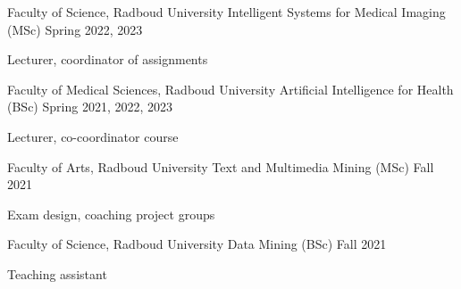 

\begin{cventries}


  \cventry
    {Faculty of Science, Radboud University} %
    {Intelligent Systems for Medical Imaging (MSc)} %
    {}
    {Spring 2022, 2023} %
    {
      \begin{cvitems} %
        \item {Lecturer, coordinator of assignments}
      \end{cvitems}
    }

  \cventry
    {Faculty of Medical Sciences, Radboud University} %
    {Artificial Intelligence for Health (BSc)} %
    {}
    {Spring 2021, 2022, 2023} %
    {
      \begin{cvitems} %
        \item {Lecturer, co-coordinator course}
      \end{cvitems}
    }

  \cventry
    {Faculty of Arts, Radboud University} %
    {Text and Multimedia Mining (MSc)} %
    {}
    {Fall 2021} %
    {
      \begin{cvitems} %
        \item {Exam design, coaching project groups}
      \end{cvitems}
    }

  \cventry
    {Faculty of Science, Radboud University} %
    {Data Mining (BSc)} %
    {}
    {Fall 2021} %
    {
      \begin{cvitems} %
        \item {Teaching assistant}
      \end{cvitems}
    }


\end{cventries}
